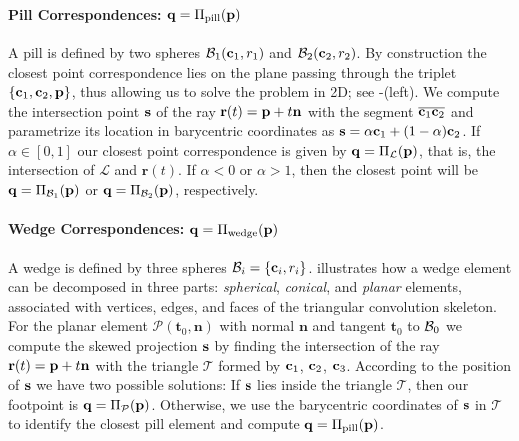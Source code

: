\paragraph{Pill Correspondences: $\mathbf{q}=\Pi_\text{pill}(\mathbf{p})$}
A pill is defined by two spheres $\mathcal{B}_1(\mathbf{c}_1,r_1)$ and $\mathcal{B}_2(\mathbf{c}_2,r_2)$. By construction the closest point correspondence lies on the plane passing through the triplet $\{ \mathbf{c}_1, \mathbf{c}_2, \mathbf{p} \}$, thus allowing us to solve the problem in 2D; see -(left). 
We compute the intersection point $\mathbf{s}$ of the ray $\mathbf{r}(t) = \mathbf{p} + t\mathbf{n}$ with the segment $\overline{\mathbf{c}_1 \mathbf{c}_2}$ and parametrize its location in barycentric coordinates as $\mathbf{s} = \alpha\mathbf{c}_1 + (1-\alpha)\mathbf{c}_2$. If $\alpha \in [0,1]$ our closest point correspondence is given by $\mathbf{q}=\Pi_\mathcal{L}(\mathbf{p})$, that is, the intersection of $\mathcal{L}$ and $\mathbf{r}(t)$.  If $\alpha<0$ or $\alpha>1$, then the closest point will be $\mathbf{q}=\Pi_{\mathcal{B}_1}(\mathbf{p})$ or $\mathbf{q}=\Pi_{\mathcal{B}_2}(\mathbf{p})$, respectively. 

\paragraph{Wedge Correspondences: $\mathbf{q}=\Pi_\text{wedge}(\mathbf{p})$}
A wedge is defined by three spheres $\mathcal{B}_i = \{\mathbf{c}_i, r_i\}$.   illustrates how a wedge element can be decomposed in three parts: \emph{spherical}, \emph{conical}, and \emph{planar} elements, associated with vertices, edges, and faces of the triangular convolution skeleton. For the planar element $\mathcal{P}(\mathbf{t}_0,\mathbf{n})$ with normal $\mathbf{n}$ and tangent $\mathbf{t}_0$ to $\mathcal{B}_0$
we compute the skewed projection $\mathbf{s}$ by finding the intersection of the ray $\mathbf{r}(t) = \mathbf{p} + t\mathbf{n}$ with the triangle $\mathcal{T}$ formed by $\mathbf{c}_1$, $\mathbf{c}_2$, $\mathbf{c}_3$. 
% 
According to the position of $\mathbf{s}$ we have two possible solutions:
If $\mathbf{s}$ lies inside the triangle $\mathcal{T}$, then our footpoint is $\mathbf{q} = \Pi_\mathcal{P}(\mathbf{p})$. Otherwise, we use the barycentric coordinates of $\mathbf{s}$ in $\mathcal{T}$ to identify the closest pill element and compute $\mathbf{q}=\Pi_\text{pill}(\mathbf{p})$.

